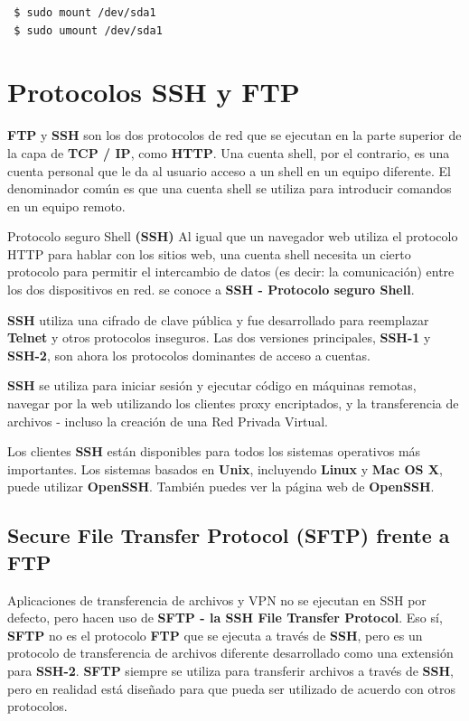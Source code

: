 \documentclass{article}
\begin{document}
\begin{verbatim}
 $ sudo mount /dev/sda1
 $ sudo umount /dev/sda1 

\end{verbatim}

\section{Protocolos SSH y FTP}

\textbf{FTP} y \textbf{SSH} son los dos protocolos de red que se ejecutan en la parte superior de la capa de \textbf{TCP / IP}, como \textbf{HTTP}. Una cuenta shell, por el contrario, es una cuenta personal que le da al usuario acceso a un shell en un equipo diferente. El denominador común es que una cuenta shell se utiliza para introducir comandos en un equipo remoto. \newline

Protocolo seguro Shell \textbf{(SSH)} Al igual que un navegador web utiliza el protocolo HTTP para hablar con los sitios web, una cuenta shell necesita un cierto protocolo para permitir el intercambio de datos (es decir: la comunicación) entre los dos dispositivos en red. se conoce a \textbf{SSH - Protocolo seguro Shell}. \newline

\textbf{SSH} utiliza una cifrado de clave pública y fue desarrollado para reemplazar \textbf{Telnet} y otros protocolos inseguros. Las dos versiones principales, \textbf{SSH-1} y \textbf{SSH-2}, son ahora los protocolos dominantes de acceso a cuentas. \newline

\textbf{SSH} se utiliza para iniciar sesión y ejecutar código en máquinas remotas, navegar por la web utilizando los clientes proxy encriptados, y la transferencia de archivos - incluso la creación de una Red Privada Virtual.

Los clientes \textbf{SSH} están disponibles para todos los sistemas operativos más importantes. Los sistemas basados en \textbf{Unix}, incluyendo \textbf{Linux} y \textbf{Mac OS X}, puede utilizar \textbf{OpenSSH}. También puedes ver la página web de \textbf{OpenSSH}.

\subsection{Secure File Transfer Protocol (SFTP) frente a FTP}

Aplicaciones de transferencia de archivos y VPN no se ejecutan en SSH por defecto, pero hacen uso de \textbf{SFTP - la SSH File Transfer Protocol}. Eso sí, \textbf{SFTP} no es el protocolo \textbf{FTP} que se ejecuta a través de \textbf{SSH}, pero es un protocolo de transferencia de archivos diferente desarrollado como una extensión para \textbf{SSH-2}. \textbf{SFTP} siempre se utiliza para transferir archivos a través de \textbf{SSH}, pero en realidad está diseñado para que pueda ser utilizado de acuerdo con otros protocolos. \newline
\end{document}
